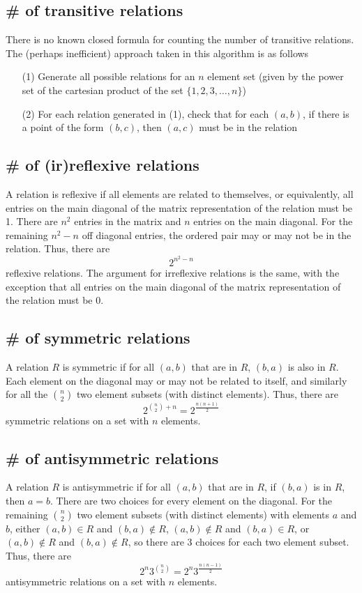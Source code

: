 \documentclass{article}
\begin{document}
\subsection{\# of transitive relations}
There is no known closed formula for counting the number of transitive relations. The (perhaps inefficient) approach taken in this algorithm is as follows
\begin{enumerate}
\item[(1)] Generate all possible relations for an $n$ element set (given by the power set of the cartesian product of the set $\{1,2,3,\dots,n\}$)
\item[(2)] For each relation generated in (1), check that for each $(a,b)$, if there is a point of the form $(b,c)$, then $(a,c)$ must be in the relation
\end{enumerate}
\subsection{\# of (ir)reflexive relations}
A relation is reflexive if all elements are related to themselves, or equivalently, all entries on the main diagonal of the matrix representation of the relation must be 1. There are $n^2$ entries in the matrix and $n$ entries on the main diagonal. For the remaining $n^2-n$ off diagonal entries, the ordered pair may or may not be in the relation. Thus, there are
\[2^{n^2-n}\]
reflexive relations. The argument for irreflexive relations is the same, with the exception that all entries on the main diagonal of the matrix representation of the relation must be 0.
\subsection{\# of symmetric relations}
A relation $R$ is symmetric if for all $(a,b)$ that are in $R$, $(b,a)$ is also in $R$. Each element on the diagonal may or may not be related to itself, and similarly for all the ${n \choose 2}$ two element subsets (with distinct elements). Thus, there are
\[2^{{n \choose 2} + n} = 2^{\frac{n(n+1)}{2}}\]
symmetric relations on a set with $n$ elements.
\subsection{\# of antisymmetric relations}
A relation $R$ is antisymmetric if for all $(a,b)$ that are in $R$, if $(b,a)$ is in $R$, then $a=b$. There are two choices for every element on the diagonal. For the remaining ${n \choose 2}$ two element subsets (with distinct elements) with elements $a$ and $b$, either $(a,b) \in R$ and $(b,a) \not \in R$, $(a,b) \not \in R$ and $(b,a) \in R$, or $(a,b) \not \in R$ and $(b,a) \not \in R$, so there are 3 choices for each two element subset. Thus, there are
\[2^n3^{{n \choose 2}} = 2^n3^{\frac{n(n-1)}{2}}\]
antisymmetric relations on a set with $n$ elements.
\end{document}

